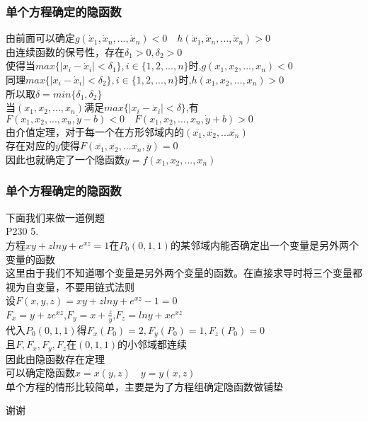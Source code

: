 \documentclass[xetex]{beamer}
\begin{document}
\begin{frame}
	\frametitle{单个方程确定的隐函数}
	由前面可以确定$g(\dot x_1,\dot x_n,...,\dot x_n)<0\quad h(\dot x_1,\dot x_n,...,\dot x_n)>0$\\
	由连续函数的保号性，存在$\delta_1>0,\delta_2>0$\\
	使得当$max\{|x_i-\dot x_i|<\delta_1\},i \in \{1,2,...,n\}$时,$g(x_1,x_2,...,x_n)<0$\\
	同理$max\{|x_i-\dot x_i|<\delta_2\},i \in \{1,2,...,n\}$时,$h(x_1,x_2,...,x_n)>0$\\ \pause
	所以取$\delta=min\{\delta_1,\delta_2 \}$\\
	当$(x_1,x_2,...,x_n)$满足$max\{|x_i-\dot x_i|<\delta\}$,有$F(x_1,x_2,...,x_n,\dot y-b)<0\quad F(x_1,x_2,...,x_n,\dot y+b)>0$\\ \pause
	由介值定理，对于每一个在方形邻域内的$(\overline{x_1},\overline{x_2},...\overline{x_n})$\\
	存在对应的$\overline{y}$\quad 使得$F(\overline{x_1},\overline{x_2},...\overline{x_n},\overline{y})=0$\\ \pause
	因此也就确定了一个隐函数$y=f(x_1,x_2,...,x_n)$\\
\end{frame}

\begin{frame}

\frametitle{单个方程确定的隐函数}
	下面我们来做一道例题\\
	P230 5.\\
	方程$xy+zlny+e^{xz}=1$在$P_0(0,1,1)$的某邻域内能否确定出一个变量是另外两个变量的函数\\ \pause
	这里由于我们不知道哪个变量是另外两个变量的函数。在直接求导时将三个变量都视为自变量，不要用链式法则\\
	设$F(x,y,z)=xy+zlny+e^{xz}-1=0$\\ \pause
	$F_x=y+ze^{xz}$,$F_y=x+\frac{z}{y}$,$F_z=lny+xe^{xz}$\\
	代入$P_0(0,1,1)$得$F_x(P_0)=2,F_y(P_0)=1,F_z(P_0)=0$\\ \pause
	且$F,F_x,F_y,F_z$在$(0,1,1)$的小邻域都连续\\
	因此由隐函数存在定理\\
	可以确定隐函数$x=x(y,z)\quad y=y(x,z)$\\ \pause
	单个方程的情形比较简单，主要是为了方程组确定隐函数做铺垫
\end{frame}

\begin{frame}[standout]
	谢谢
\end{frame}
\end{document}

